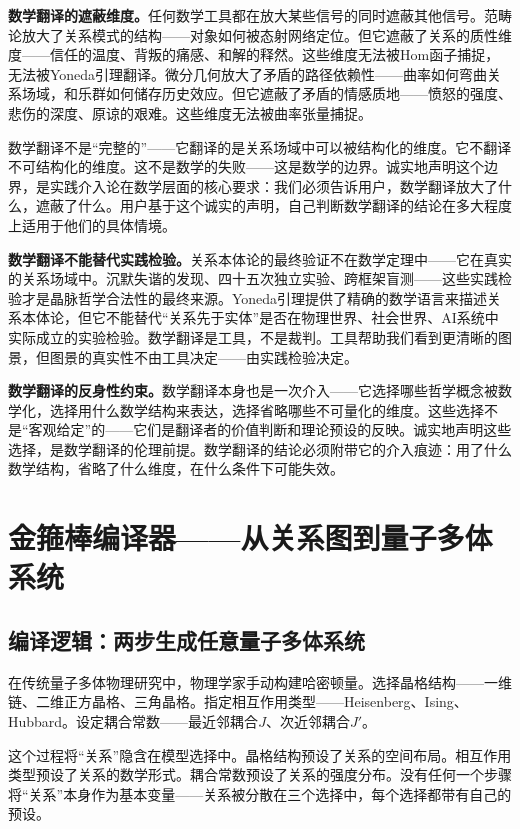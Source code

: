 \documentclass[11pt,a4paper]{book}
\theoremstyle{definition}
\begin{document}
\textbf{数学翻译的遮蔽维度。}任何数学工具都在放大某些信号的同时遮蔽其他信号。范畴论放大了关系模式的结构——对象如何被态射网络定位。但它遮蔽了关系的质性维度——信任的温度、背叛的痛感、和解的释然。这些维度无法被Hom函子捕捉，无法被Yoneda引理翻译。微分几何放大了矛盾的路径依赖性——曲率如何弯曲关系场域，和乐群如何储存历史效应。但它遮蔽了矛盾的情感质地——愤怒的强度、悲伤的深度、原谅的艰难。这些维度无法被曲率张量捕捉。

数学翻译不是“完整的”——它翻译的是关系场域中可以被结构化的维度。它不翻译不可结构化的维度。这不是数学的失败——这是数学的边界。诚实地声明这个边界，是实践介入论在数学层面的核心要求：我们必须告诉用户，数学翻译放大了什么，遮蔽了什么。用户基于这个诚实的声明，自己判断数学翻译的结论在多大程度上适用于他们的具体情境。

\textbf{数学翻译不能替代实践检验。}关系本体论的最终验证不在数学定理中——它在真实的关系场域中。沉默失谐的发现、四十五次独立实验、跨框架盲测——这些实践检验才是晶脉哲学合法性的最终来源。Yoneda引理提供了精确的数学语言来描述关系本体论，但它不能替代“关系先于实体”是否在物理世界、社会世界、AI系统中实际成立的实验检验。数学翻译是工具，不是裁判。工具帮助我们看到更清晰的图景，但图景的真实性不由工具决定——由实践检验决定。

\textbf{数学翻译的反身性约束。}数学翻译本身也是一次介入——它选择哪些哲学概念被数学化，选择用什么数学结构来表达，选择省略哪些不可量化的维度。这些选择不是“客观给定”的——它们是翻译者的价值判断和理论预设的反映。诚实地声明这些选择，是数学翻译的伦理前提。数学翻译的结论必须附带它的介入痕迹：用了什么数学结构，省略了什么维度，在什么条件下可能失效。

\chapter{金箍棒编译器——从关系图到量子多体系统}

\section{编译逻辑：两步生成任意量子多体系统}

在传统量子多体物理研究中，物理学家手动构建哈密顿量。选择晶格结构——一维链、二维正方晶格、三角晶格。指定相互作用类型——Heisenberg、Ising、Hubbard。设定耦合常数——最近邻耦合$J$、次近邻耦合$J'$。

这个过程将“关系”隐含在模型选择中。晶格结构预设了关系的空间布局。相互作用类型预设了关系的数学形式。耦合常数预设了关系的强度分布。没有任何一个步骤将“关系”本身作为基本变量——关系被分散在三个选择中，每个选择都带有自己的预设。
\end{document}
